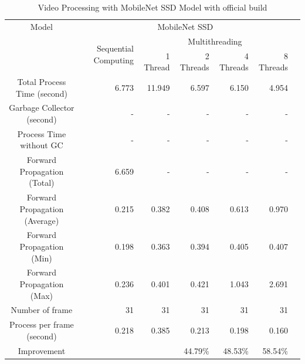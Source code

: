             \begin{table}[!htp]\centering
                \scriptsize
                \begin{tabular}{lrrrrrrr}\toprule
                    \multicolumn{2}{c}{Model} &\multicolumn{5}{c}{MobileNet SSD} \\\cmidrule{1-7}
                    \multicolumn{2}{c}{\multirow{2}{*}{}} &\multirow{2}{*}{Sequential Computing} &\multicolumn{4}{c}{Multithreading} \\\cmidrule{4-7}
                    & & &1 Thread &2 Threads &4 Threads &8 Threads \\\midrule
                    \multicolumn{2}{c}{Total Process Time (second)} &6.773 &11.949 &6.597 &6.150 &4.954 \\
                    \multicolumn{2}{c}{Garbage Collector (second)} &- &- &- &- &- \\
                    \multicolumn{2}{c}{Process Time without GC} &- &- &- &- &- \\
                    \multicolumn{2}{c}{Forward Propagation (Total)} &6.659 &- &- &- &- \\
                    \multicolumn{2}{c}{Forward Propagation (Average)} &0.215 &0.382 &0.408 &0.613 &0.970 \\
                    \multicolumn{2}{c}{Forward Propagation (Min)} &0.198 &0.363 &0.394 &0.405 &0.407 \\
                    \multicolumn{2}{c}{Forward Propagation (Max)} &0.236 &0.401 &0.421 &1.043 &2.691 \\
                    \multicolumn{2}{c}{Number of frame} &31 &31 &31 &31 &31 \\
                    \multicolumn{2}{c}{Process per frame (second)} &0.218 &0.385 &0.213 &0.198 &0.160 \\
                    \multicolumn{2}{c}{Improvement} & & &44.79\% &48.53\% &58.54\% \\
                    \bottomrule
                \end{tabular}

                \caption{Video Processing with MobileNet SSD Model with official build}\label{ssd:official-performace-cpp}
            \end{table}

